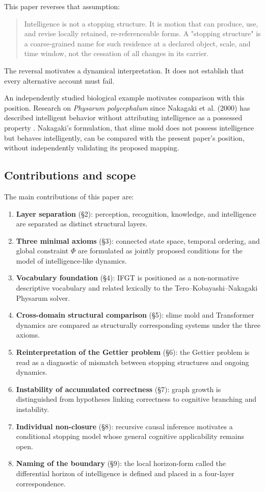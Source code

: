 This paper reverses that assumption:

\begin{quote}
Intelligence is not a stopping structure. It is motion that can produce, use, and revise locally retained, re-referenceable forms. A "stopping structure" is a coarse-grained name for such residence at a declared object, scale, and time window, not the cessation of all changes in its carrier.
\end{quote}

The reversal motivates a dynamical interpretation. It does not establish that every alternative account must fail.

An independently studied biological example motivates comparison with this position. Research on \emph{Physarum polycephalum} since Nakagaki et al. (2000) has described intelligent behavior without attributing intelligence as a possessed property \citep{Nakagaki2000,Tero2007}. Nakagaki's formulation, that slime mold does not possess intelligence but behaves intelligently, can be compared with the present paper's position, without independently validating its proposed mapping.

\subsection{Contributions and scope}

The main contributions of this paper are:

\begin{enumerate}
\item \textbf{Layer separation} (\S{}2): perception, recognition, knowledge, and intelligence are separated as distinct structural layers.
\item \textbf{Three minimal axioms} (\S{}3): connected state space, temporal ordering, and global constraint $\Phi$ are formulated as jointly proposed conditions for the model of intelligence-like dynamics.
\item \textbf{Vocabulary foundation} (\S{}4): IFGT is positioned as a non-normative descriptive vocabulary and related lexically to the Tero--Kobayashi--Nakagaki Physarum solver.
\item \textbf{Cross-domain structural comparison} (\S{}5): slime mold and Transformer dynamics are compared as structurally corresponding systems under the three axioms.
\item \textbf{Reinterpretation of the Gettier problem} (\S{}6): the Gettier problem is read as a diagnostic of mismatch between stopping structures and ongoing dynamics.
\item \textbf{Instability of accumulated correctness} (\S{}7): graph growth is distinguished from hypotheses linking correctness to cognitive branching and instability.
\item \textbf{Individual non-closure} (\S{}8): recursive causal inference motivates a conditional stopping model whose general cognitive applicability remains open.
\item \textbf{Naming of the boundary} (\S{}9): the local horizon-form called the differential horizon of intelligence is defined and placed in a four-layer correspondence.
\end{enumerate}

